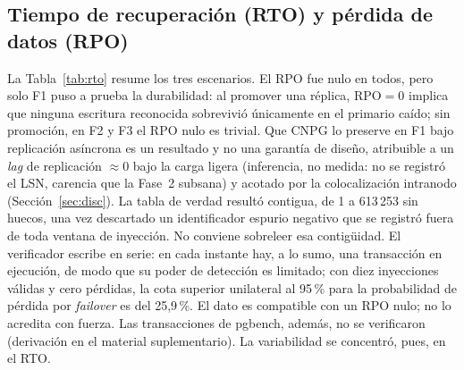 \documentclass[12pt,twocolumn,letterpaper]{article}
\begin{document}
\subsection{Tiempo de recuperación (RTO) y pérdida de datos (RPO)}\label{sec:rtorpo}
La Tabla~\ref{tab:rto} resume los tres escenarios. El RPO fue nulo en todos, pero solo F1 puso a prueba la durabilidad: al promover una réplica, $\text{RPO}=0$ implica que ninguna escritura reconocida sobrevivió únicamente en el primario caído; sin promoción, en F2 y F3 el RPO nulo es trivial. Que CNPG lo preserve en F1 bajo replicación asíncrona es un resultado y no una garantía de diseño, atribuible a un \textit{lag} de replicación $\approx 0$ bajo la carga ligera  (inferencia, no medida: no se registró el LSN, carencia que la Fase~2 subsana) y acotado por la colocalización intranodo (Sección~\ref{sec:disc}). La tabla de verdad resultó contigua, de 1 a 613\,253 sin huecos, una vez descartado un identificador espurio negativo que se registró fuera de toda ventana de inyección. No conviene sobreleer esa contigüidad. El verificador escribe en serie: en cada instante hay, a lo sumo, una transacción en ejecución, de modo que su poder de detección es limitado; con diez inyecciones válidas y cero pérdidas, la cota superior unilateral al 95\,\% para la probabilidad de pérdida por \textit{failover} es del 25,9\,\%. El dato es compatible con un RPO nulo; no lo acredita con fuerza. Las transacciones de pgbench, además, no se verificaron (derivación en el material suplementario). La variabilidad se concentró, pues, en el RTO.
\end{document}
